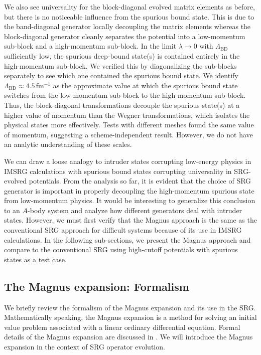 \documentclass[10pt,aps,prc,floatfix,twocolumn,nofootinbib]{revtex4-1}
\newcommand{\LambdaBD}{{\Lambda_{\text{BD}}}}
\begin{document}
We also see universality for the block-diagonal evolved matrix elements as before, but there is no noticeable influence from the spurious bound state.
This is due to the band-diagonal generator locally decoupling the matrix elements whereas the block-diagonal generator cleanly separates the potential into a low-momentum sub-block and a high-momentum sub-block.
In the limit $\lambda \rightarrow 0$ with $\LambdaBD$ sufficiently low, the spurious deep-bound state(s) is contained entirely in the high-momentum sub-block.
We verified this by diagonalizing the sub-blocks separately to see which one contained the spurious bound state.
We identify $\LambdaBD \approx 4.5$\,fm$^{-1}$ as the approximate value at which the spurious bound state switches from the low-momentum sub-block to the high-momentum sub-block.
Thus, the block-diagonal transformations decouple the spurious state(s) at a higher value of momentum than the Wegner transformations, which isolates the physical states more effectively.
Tests with different meshes found the same value of momentum, suggesting a scheme-independent result.
However, we do not have an analytic understanding of these scales.


We can draw a loose analogy to intruder states corrupting low-energy physics in IMSRG calculations with spurious bound states corrupting universality in SRG-evolved potentials.
From the analysis so far, it is evident that the choice of SRG generator is important in properly decoupling the high-momentum spurious state from low-momentum physics.
It would be interesting to generalize this conclusion to an $A$-body system and analyze how different generators deal with intruder states.
However, we must first verify that the Magnus approach is the same as the conventional SRG approach for difficult systems because of its use in IMSRG calculations.
In the following sub-sections, we present the Magnus approach and compare to the conventional SRG using high-cutoff potentials with spurious states as a test case.


\subsection{The Magnus expansion: Formalism}
\label{sec:magnus_expansion_formalism}


We briefly review the formalism of the Magnus expansion and its use in the SRG.
Mathematically speaking, the Magnus expansion is a method for solving an initial value problem associated with a linear ordinary differential equation.
Formal details of the Magnus expansion are discussed in \cite{Blanes:2009ab}.
We will introduce the Magnus expansion in the context of SRG operator evolution.
\end{document}
